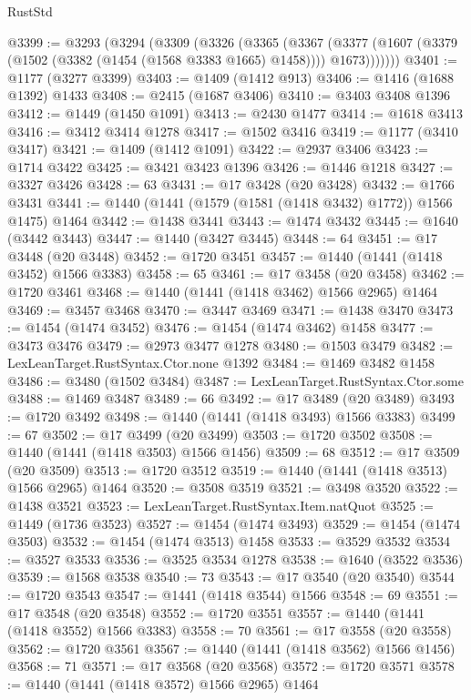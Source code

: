 \begin{lexlean}{RustStd}
\begin{coremodule}
{\begin{coremodule}
{{{{{{{{{{{{{{{{{{{{{{{{{{{{{{{@3399 := @3293
    (@3294
      (@3309
        (@3326
          (@3365
            (@3367
              (@3377 (@1607 (@3379 (@1502 (@3382 (@1454 (@1568 @3383 @1665) @1458)))) @1673)))))))
@3401 := @1177 (@3277 @3399)
@3403 := @1409 (@1412 @913)
@3406 := @1416 (@1688 @1392) @1433
@3408 := @2415 (@1687 @3406)
@3410 := @3403 @3408 @1396
@3412 := @1449 (@1450 @1091)
@3413 := @2430 @1477
@3414 := @1618 @3413
@3416 := @3412 @3414 @1278
@3417 := @1502 @3416
@3419 := @1177 (@3410 @3417)
@3421 := @1409 (@1412 @1091)
@3422 := @2937 @3406
@3423 := @1714 @3422
@3425 := @3421 @3423 @1396
@3426 := @1446 @1218
@3427 := @3327 @3426
@3428 := 63
@3431 := @17 @3428 (@20 @3428)
@3432 := @1766 @3431
@3441 := @1440 (@1441 (@1579 (@1581 (@1418 @3432) @1772)) @1566 @1475) @1464
@3442 := @1438 @3441
@3443 := @1474 @3432
@3445 := @1640 (@3442 @3443)
@3447 := @1440 (@3427 @3445)
@3448 := 64
@3451 := @17 @3448 (@20 @3448)
@3452 := @1720 @3451
@3457 := @1440 (@1441 (@1418 @3452) @1566 @3383)
@3458 := 65
@3461 := @17 @3458 (@20 @3458)
@3462 := @1720 @3461
@3468 := @1440 (@1441 (@1418 @3462) @1566 @2965) @1464
@3469 := @3457 @3468
@3470 := @3447 @3469
@3471 := @1438 @3470
@3473 := @1454 (@1474 @3452)
@3476 := @1454 (@1474 @3462) @1458
@3477 := @3473 @3476
@3479 := @2973 @3477 @1278
@3480 := @1503 @3479
@3482 := LexLeanTarget.RustSyntax.Ctor.none @1392
@3484 := @1469 @3482 @1458
@3486 := @3480 (@1502 @3484)
@3487 := LexLeanTarget.RustSyntax.Ctor.some
@3488 := @1469 @3487
@3489 := 66
@3492 := @17 @3489 (@20 @3489)
@3493 := @1720 @3492
@3498 := @1440 (@1441 (@1418 @3493) @1566 @3383)
@3499 := 67
@3502 := @17 @3499 (@20 @3499)
@3503 := @1720 @3502
@3508 := @1440 (@1441 (@1418 @3503) @1566 @1456)
@3509 := 68
@3512 := @17 @3509 (@20 @3509)
@3513 := @1720 @3512
@3519 := @1440 (@1441 (@1418 @3513) @1566 @2965) @1464
@3520 := @3508 @3519
@3521 := @3498 @3520
@3522 := @1438 @3521
@3523 := LexLeanTarget.RustSyntax.Item.natQuot
@3525 := @1449 (@1736 @3523)
@3527 := @1454 (@1474 @3493)
@3529 := @1454 (@1474 @3503)
@3532 := @1454 (@1474 @3513) @1458
@3533 := @3529 @3532
@3534 := @3527 @3533
@3536 := @3525 @3534 @1278
@3538 := @1640 (@3522 @3536)
@3539 := @1568 @3538
@3540 := 73
@3543 := @17 @3540 (@20 @3540)
@3544 := @1720 @3543
@3547 := @1441 (@1418 @3544) @1566
@3548 := 69
@3551 := @17 @3548 (@20 @3548)
@3552 := @1720 @3551
@3557 := @1440 (@1441 (@1418 @3552) @1566 @3383)
@3558 := 70
@3561 := @17 @3558 (@20 @3558)
@3562 := @1720 @3561
@3567 := @1440 (@1441 (@1418 @3562) @1566 @1456)
@3568 := 71
@3571 := @17 @3568 (@20 @3568)
@3572 := @1720 @3571
@3578 := @1440 (@1441 (@1418 @3572) @1566 @2965) @1464
}}}}}}}}}}}}}}}}}}}}}}}}}}}}}}}
\end{coremodule}}
\end{coremodule}
\end{lexlean}
